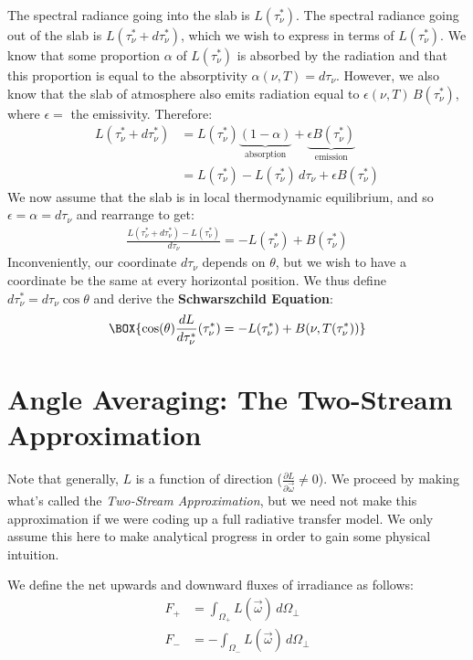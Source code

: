 The spectral radiance going into the slab is $L(\tau_\nu^*)$. The spectral radiance going out of the slab is $L(\tau_\nu^*+d\tau_\nu^*)$, which we wish to express in terms of $L(\tau_\nu^*)$. We know that some proportion $\alpha$ of $L(\tau_\nu^*)$ is absorbed by the radiation and that this proportion is equal to the absorptivity $\alpha(\nu,T) = d\tau_\nu$. However, we also know that the slab of atmosphere also emits radiation equal to $\epsilon(\nu,T)\,B(\tau_\nu^*)$, where $\epsilon=$ the emissivity. Therefore:
\begin{align*}
    L(\tau_\nu^*+d\tau_\nu^*)&=L(\tau_\nu^*)\underbrace{(1-\alpha)}_{\text{absorption}}+\underbrace{\epsilon B(\tau_\nu^*)}_\text{emission}\\
    &=L(\tau_\nu^*) - L(\tau_\nu^*)\,d\tau_\nu + \epsilon B(\tau_\nu^*)
\end{align*}
We now assume that the slab is in local thermodynamic equilibrium, and so $\epsilon=\alpha=d\tau_\nu$ and rearrange to get:
\begin{align*}
    \frac{L(\tau_\nu^*+d\tau_\nu^*)-L(\tau_\nu^*)}{d\tau_\nu}=-L(\tau_\nu^*)+B(\tau_\nu^*)
\end{align*}
Inconveniently, our coordinate $d\tau_\nu$ depends on $\theta$, but we wish to have a coordinate be the same at every horizontal position. We thus define $d\tau_\nu^*=d\tau_\nu\cos\theta$ and derive the \textbf{Schwarszchild Equation}:
\begin{align}\label{Schwarzschild}
    \BOX{
        \cos(\theta)\frac{dL}{d\tau_\nu^*}(\tau_\nu^*)=-L(\tau_\nu^*)+B(\nu,T(\tau_\nu^*))
    }
\end{align}

\section{Angle Averaging: The Two-Stream Approximation}\label{Two Stream Approximation}

Note that generally, $L$ is a function of direction ($\frac{\partial L}{\partial \vec{\omega}}\neq0$). We proceed by making what's called the \textit{Two-Stream Approximation}, but we need not make this approximation if we were coding up a full radiative transfer model. We only assume this here to make analytical progress in order to gain some physical intuition.

We define the net upwards and downward fluxes of irradiance as follows:
\begin{align}
    F_+&=\int_{\Omega_+}L(\vec{\omega})\,d\Omega_\perp \\
    F_-&=-\int_{\Omega_-}L(\vec{\omega})\,d\Omega_\perp 
\end{align}

